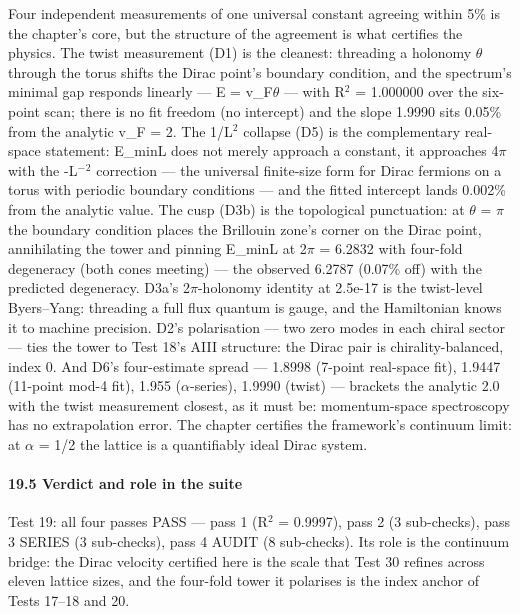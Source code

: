 \documentclass[10pt]{article}
\begin{document}
Four independent measurements of one universal constant agreeing within 5\% is the chapter's core, but the structure of the agreement is what certifies the physics. The twist measurement (D1) is the cleanest: threading a holonomy $\theta$ through the torus shifts the Dirac point's boundary condition, and the spectrum's minimal gap responds linearly --- E = v\_F$\theta$ --- with R$^2$ = 1.000000 over the six-point scan; there is no fit freedom (no intercept) and the slope 1.9990 sits 0.05\% from the analytic v\_F = 2. The 1/L$^2$ collapse (D5) is the complementary real-space statement: E\_min\textperiodcentered{}L does not merely approach a constant, it approaches 4$\pi$ with the -L$^-$$^2$ correction --- the universal finite-size form for Dirac fermions on a torus with periodic boundary conditions --- and the fitted intercept lands 0.002\% from the analytic value. The cusp (D3b) is the topological punctuation: at $\theta$ = $\pi$ the boundary condition places the Brillouin zone's corner on the Dirac point, annihilating the tower and pinning E\_min\textperiodcentered{}L at 2$\pi$ = 6.2832 with four-fold degeneracy (both cones meeting) --- the observed 6.2787 (0.07\% off) with the predicted degeneracy. D3a's 2$\pi$-holonomy identity at 2.5e-17 is the twist-level Byers--Yang: threading a full flux quantum is gauge, and the Hamiltonian knows it to machine precision. D2's polarisation --- two zero modes in each chiral sector --- ties the tower to Test 18's AIII structure: the Dirac pair is chirality-balanced, index 0. And D6's four-estimate spread --- 1.8998 (7-point real-space fit), 1.9447 (11-point mod-4 fit), 1.955 ($\alpha$-series), 1.9990 (twist) --- brackets the analytic 2.0 with the twist measurement closest, as it must be: momentum-space spectroscopy has no extrapolation error. The chapter certifies the framework's continuum limit: at $\alpha$ = 1/2 the lattice is a quantifiably ideal Dirac system.

\paragraph{19.5 Verdict and role in the suite}

Test 19: all four passes PASS --- pass 1 (R$^2$ = 0.9997), pass 2 (3 sub-checks), pass 3 SERIES (3 sub-checks), pass 4 AUDIT (8 sub-checks). Its role is the continuum bridge: the Dirac velocity certified here is the scale that Test 30 refines across eleven lattice sizes, and the four-fold tower it polarises is the index anchor of Tests 17--18 and 20.
\end{document}
